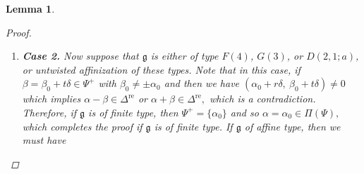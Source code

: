 \documentclass[11pt,reqno]{amsart}
\theoremstyle{plain}
\newtheorem*{lemma}{Lemma}
\theoremstyle{definition}
\theoremstyle{remark}
\newcommand{\lie}[1]{\mathfrak{#1}}
\numberwithin{equation}{section}
\begin{document}
\begin{lemma}
\begin{proof}
\begin{enumerate}[leftmargin=*]
     \begin{equation}\label{betap}
         \beta_p=\lambda_i\epsilon_i+c_{m_p}\delta_{m_p}+t_p\delta.
     \end{equation} 
    Since $\alpha\pm\beta_p\notin\Delta^{\mathrm{re}}$, it follows that if $\lie g$ is of finite type, then ($t_p=0$ and) necessarily $\alpha=\beta_p$. Hence, for the remainder of this case we assume that $\lie g$ is of affine type and claim that $\alpha-\beta_p\in\Delta^{\mathrm{im}}$. It suffices to show that $\alpha-\beta_p\in\Delta$. First suppose that $\lie g$ is untwisted. Then $\alpha-\beta_p\notin\Delta$ would force $\alpha=\beta_p$, which is impossible. Thus $\alpha-\beta_p\in\Delta$ in this case. If $\lie g$ is twisted (not $A(2k,2l)^{(4)}$) and $\alpha-\beta_p\notin\Delta$, then necessarily $$j=m_p,\ c_{m_p}=-\lambda_j,\ \text{ and $r$ and $t_p$ have different parities}.$$ Therefore, $\beta_p=\lambda_i\epsilon_i-\lambda_j\delta_j+t_p\delta$, which implies $\alpha+\beta_p\in\Delta^{\mathrm{re}}$, a contradiction. Finally, let $\lie g$ be of type $A(2k,2l)^{(4)}$. If $\alpha-\beta_p\notin\Delta$, then we have $$j=m_p,\ c_{m_p}=-\lambda_j,\ \text{ and $(r,t_p)=(2r_1,2t_{p_1})$}$$ 
     for some $r_1,t_{p_1}$ of different parity. As in the previous case, this again implies $\alpha+\beta_p\in\Delta^{\mathrm{re}}$, a contradiction. Thus, in all affine cases we conclude that $\alpha-\beta_p\in\Delta$, and hence $\alpha-\beta_p\in\Delta^{\mathrm{im}}$.\smallskip

    \item \textbf{Case 2.} Now suppose that $\lie g$ is either of type $F(4)$, $G(3)$, or $D(2,1;a)$, or untwisted affinization of these types. Note that in this case, if $\beta=\beta_{0}+t\delta \in \Psi^{+}$ with $\beta_{0} \neq \pm \alpha_{0}$ and then we have $(\alpha_{0}+r\delta,\ \beta_{0}+t\delta) \neq 0$ which implies $\alpha-\beta\in \Delta^{\mathrm{re}}$ or $\alpha+\beta\in\Delta^{\mathrm{re}},$ which is a contradiction. Therefore, if $\lie g$ is of finite type, then $\Psi^+=\{\alpha_0\}$ and so $\alpha=\alpha_0\in \Pi(\Psi),$ which completes the proof if $\lie g$ is of finite type. If $\lie g$ of affine type, then we must have 

\end{enumerate}
\end{proof}
\end{lemma}
\end{document}
